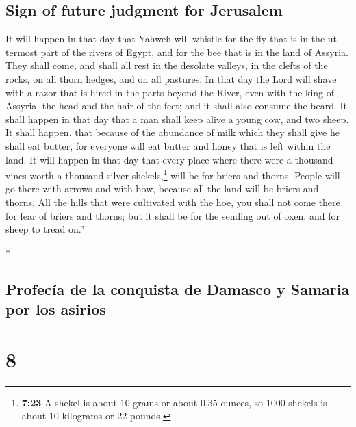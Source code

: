 \begin{paracol}{2}
\begin{otherlanguage}{english}
\hypertarget{sign-of-future-judgment-for-jerusalem}{%
\subsection{Sign of future judgment for
Jerusalem}\label{sign-of-future-judgment-for-jerusalem}}

 It will happen in that day that Yahweh will whistle for
the fly that is in the uttermost part of the rivers of Egypt, and for
the bee that is in the land of Assyria.  They shall come,
and shall all rest in the desolate valleys, in the clefts of the rocks,
on all thorn hedges, and on all pastures.  In that day
the Lord will shave with a razor that is hired in the parts beyond the
River, even with the king of Assyria, the head and the hair of the feet;
and it shall also consume the beard.  It shall happen in
that day that a man shall keep alive a young cow, and two sheep.
 It shall happen, that because of the abundance of milk
which they shall give he shall eat butter, for everyone will eat butter
and honey that is left within the land.  It will happen
in that day that every place where there were a thousand vines worth a
thousand silver shekels,\footnote{\textbf{7:23} A shekel is about 10
  grams or about 0.35 ounces, so 1000 shekels is about 10 kilograms or
  22 pounds.} will be for briers and thorns.  People will
go there with arrows and with bow, because all the land will be briers
and thorns.  All the hills that were cultivated with the
hoe, you shall not come there for fear of briers and thorns; but it
shall be for the sending out of oxen, and for sheep to tread on.''

\end{otherlanguage}

\switchcolumn[0]*

\hypertarget{profecuxeda-de-la-conquista-de-damasco-y-samaria-por-los-asirios}{%
\subsection{Profecía de la conquista de Damasco y Samaria por los
asirios}\label{profecuxeda-de-la-conquista-de-damasco-y-samaria-por-los-asirios}}

\hypertarget{section-14}{%
\section{8}\label{section-14}}


\end{paracol}
